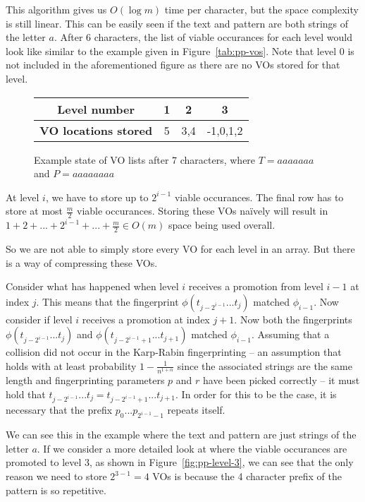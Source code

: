 \documentclass[ %
                    author={Dominic Joseph Moylett},
                supervisor={Dr. Raphael Clifford and Dr. Benjamin Sach},
                    degree={MEng},
                     title={Dictionary Matching with Fingerprints},
                  subtitle={An Empirical Analysis},
                      type={Research},
                      year={2014} ]{dissertation}
\begin{document}
This algorithm gives us $O(\log m)$ time per character, but the space complexity is still linear. This can be easily seen if the text and pattern are both strings of the letter $a$. After 6 characters, the list of viable occurances for each level would look like similar to the example given in Figure~\ref{tab:pp-vos}. Note that level 0 is not included in the aforementioned figure as there are no VOs stored for that level.

\begin{figure}[t]
\centering
\begin{tabular}{|c|c|c|c|}
  \hline
  \textbf{Level number} & 1 & 2 & 3 \\
  \hline
  \textbf{VO locations stored} & 5 & 3,4 & -1,0,1,2 \\
  \hline
\end{tabular}
\caption{Example state of VO lists after 7 characters, where $T = aaaaaaa$ and $P = aaaaaaaa$}
\label{fig:pp-vos}
\end{figure}

At level $i$, we have to store up to $2^{i - 1}$ viable occurances. The final row has to store at most $\frac{m}{2}$ viable occurances. Storing these VOs na\"{i}vely will result in $1 + 2 + ... + 2^{i - 1} + ... + \frac{m}{2} \in O(m)$ space being used overall.

So we are not able to simply store every VO for each level in an array. But there is a way of compressing these VOs.

Consider what has happened when level $i$ receives a promotion from level $i-1$ at index $j$. This means that the fingerprint $\phi(t_{j - 2^{i-1}}...t_j)$ matched $\phi_{i-1}$. Now consider if level $i$ receives a promotion at index $j+1$. Now both the fingerprints $\phi(t_{j - 2^{i-1}}...t_j)$ and $\phi(t_{j - 2^{i-1} + 1}...t_{j + 1})$ matched $\phi_{i-1}$. Assuming that a collision did not occur in the Karp-Rabin fingerprinting -- an assumption that holds with at least probability $1 - \frac{1}{n^{1 + \alpha}}$ since the associated strings are the same length and fingerprinting parameters $p$ and $r$ have been picked correctly -- it must hold that $t_{j - 2^{i-1}}...t_j = t_{j - 2^{i-1} + 1}...t_{j + 1}$. In order for this to be the case, it is necessary that the prefix $p_0...p_{2^{i-1} - 1}$ repeats itself.

We can see this in the example where the text and pattern are just strings of the letter $a$. If we consider a more detailed look at where the viable occurances are promoted to level 3, as shown in Figure~\ref{fig:pp-level-3}, we can see that the only reason we need to store $2^{3-1} = 4$ VOs is because the 4 character prefix of the pattern is so repetitive.
\end{document}
